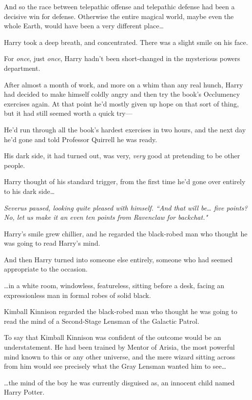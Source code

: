 And so the race between telepathic offense and telepathic defense had been a decisive win for defense. Otherwise the entire magical world, maybe even the whole Earth, would have been a very different place{\ldots}

Harry took a deep breath, and concentrated. There was a slight smile on his face.

For \emph{once}, just \emph{once}, Harry hadn't been short-changed in the mysterious powers department.

After almost a month of work, and more on a whim than any real hunch, Harry had decided to make himself coldly angry and then try the book's Occlumency exercises again. At that point he'd mostly given up hope on that sort of thing, but it had still seemed worth a quick try—

He'd run through all the book's hardest exercises in two hours, and the next day he'd gone and told Professor Quirrell he was ready.

His dark side, it had turned out, was very, \emph{very} good at pretending to be other people.

Harry thought of his standard trigger, from the first time he'd gone over entirely to his dark side{\ldots}

\emph{Severus paused, looking quite pleased with himself. ``And that will be{\ldots} five points? No, let us make it an even ten points from Ravenclaw for backchat."}

Harry's smile grew chillier, and he regarded the black-robed man who thought he was going to read Harry's mind.

And then Harry turned into someone else entirely, someone who had seemed appropriate to the occasion.

{\ldots}in a white room, windowless, featureless, sitting before a desk, facing an expressionless man in formal robes of solid black.

Kimball Kinnison regarded the black-robed man who thought he was going to read the mind of a Second-Stage Lensman of the Galactic Patrol.

To say that Kimball Kinnison was confident of the outcome would be an understatement. He had been trained by Mentor of Arisia, the most powerful mind known to this or any other universe, and the mere wizard sitting across from him would see precisely what the Gray Lensman wanted him to see{\ldots}

{\ldots}the mind of the boy he was currently disguised as, an innocent child named Harry Potter.

